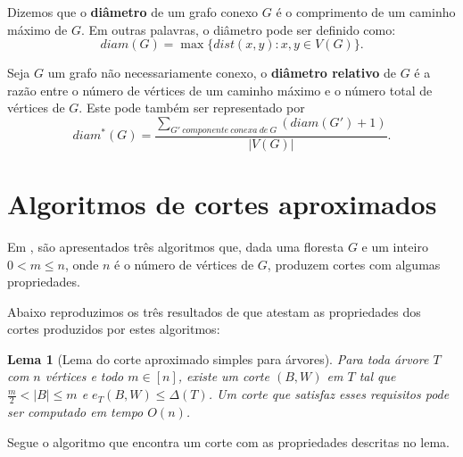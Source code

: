 \documentclass[a4paper,12pt]{article}
\newtheorem{lem}{Lema}
\begin{document}
	\bigskip
	\bigskip
	\bigskip
	\bigskip
	\bigskip
	\bigskip



	Dizemos que o \textbf{diâmetro} de um grafo conexo $G$ é o
	comprimento de um caminho máximo de $G$. 
	Em outras palavras, o diâmetro pode ser definido como:
	$$ diam(G)=\max\{dist(x,y):x,y\in V(G)\}. $$

	\bigskip

	Seja $G$ um grafo não necessariamente conexo,
	o \textbf{diâmetro relativo} de $G$
	 é a razão entre o número
	de vértices de um caminho máximo e o número total de vértices
	de $G$. Este pode também ser representado por
	$$ diam^*(G) = \frac{\displaystyle\sum_{
	G'~componente~conexa~de~G}^{}(diam(G')+1)}{|V(G)|}. $$
    
\newpage
\section {Algoritmos de cortes aproximados}

Em \cite{Schmidt15}, são apresentados três algoritmos que, dada uma 
floresta $G$ e um inteiro $0<m\le n$, onde $n$ é o número de vértices 
de $G$, produzem cortes com algumas propriedades.

Abaixo reproduzimos os três resultados de \cite{Schmidt15} que 
atestam as propriedades dos cortes produzidos por estes algoritmos:

\bigskip
\bigskip
\bigskip
\bigskip

\begin{lem}[Lema do corte aproximado simples para árvores]

	Para toda árvore $T$ com $n$ vértices e todo $m \in [n]$,
	existe um corte $(B,W)$ em $T$ tal que 
	$\frac{m}{2} <|B| \le m$ e
	$e_T(B,W) \le \Delta(T)$.
	Um corte que satisfaz esses requisitos pode ser computado em
	tempo $O(n)$.
\end{lem}

\medskip

Segue o algoritmo que encontra um corte com as propriedades descritas
no lema.

\medskip
\end{document}
